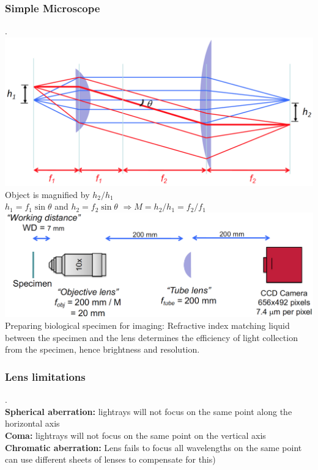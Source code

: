 \documentclass[9pt]{article}
\begin{document}
\begin{multicols}{2}
\subsubsection{Simple Microscope}.\\
\includegraphics[scale=0.1]{Images/magnification.png} 
Object is magnified by $h_2 /h_1$\\
$h_1=f_1 \sin \theta$ and $h_2=f_2 \sin \theta$ $\Rightarrow M = h_2/h_1=f_2/f_1$\\
\includegraphics[scale=0.2]{Images/simple_microscope.png} 
Preparing biological specimen for imaging: Refractive index matching liquid between the specimen and the lens
determines the efficiency of light collection from the specimen, hence
brightness and resolution.

\subsubsection{Lens limitations}.\\
\textbf{Spherical aberration:} lightrays will not focus on the same point along the horizontal axis\\
\textbf{Coma:} lightrays will not focus on the same point on the vertical axis\\
\textbf{Chromatic aberration:} Lens fails to focus all wavelengths on the same point can use different sheets of lenses to compensate for this)\\

\end{multicols}
\end{document}
